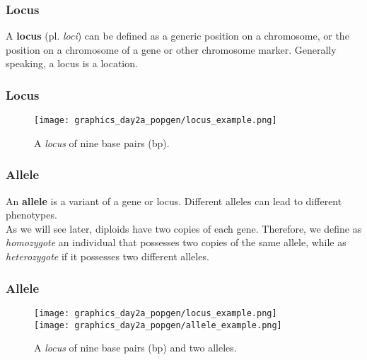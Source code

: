 \documentclass{beamer}
\newcommand{\1}{\ensuremath{\mathbf{1}}}
\begin{document}
%
%
%
\begin{frame}\frametitle{Locus}
	A \textbf{locus} (pl. \emph{loci}) can be defined as a generic position on a chromosome, or the position on a chromosome of a gene or other chromosome marker. Generally speaking, a locus is a location.
\end{frame}
%
%
%
\begin{frame}\frametitle{Locus}
	\begin{figure}
	\begin{center}
		\texttt{[image: graphics\_day2a\_popgen/locus\_example.png]}
	\end{center}
	\caption{A \emph{locus} of nine base pairs (bp).}
	\end{figure}
\end{frame}
%
%
%
\begin{frame}\frametitle{Allele}
	An \textbf{allele} is a variant of a gene or locus. Different alleles can lead to different phenotypes.\\[2ex]
	As we will see later, diploids have two copies of each gene. Therefore, we define as \emph{homozygote} an individual that possesses two copies of the same allele, while as \emph{heterozygote} if it possesses two different alleles.
\end{frame}
%
%
%
\begin{frame}\frametitle{Allele}
	\begin{figure}
	\begin{center}
		\texttt{[image: graphics\_day2a\_popgen/locus\_example.png]}\\[2ex]
		\texttt{[image: graphics\_day2a\_popgen/allele\_example.png]}
	\end{center}
	\caption{A \emph{locus} of nine base pairs (bp) and two alleles.}
	\end{figure}
\end{frame}
\end{document}
